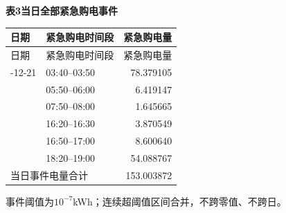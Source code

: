 \begin{center}\textbf{表3\quad 当日全部紧急购电事件}\end{center}
\begin{longtable}{llr}\toprule 日期 & 紧急购电时间段 & 紧急购电量\\\midrule\endfirsthead
\toprule 日期 & 紧急购电时间段 & 紧急购电量\\\midrule\endhead
\bottomrule\endfoot
2025-12-21 & 03:40--03:50 & 78.379105\\
 & 05:50--06:00 & 6.419147\\
 & 07:50--08:00 & 1.645665\\
 & 16:20--16:30 & 3.870549\\
 & 16:50--17:00 & 8.600640\\
 & 18:20--19:00 & 54.088767\\
\midrule\multicolumn{2}{l}{当日事件电量合计} & 153.003872\\
\end{longtable}
\noindent 事件阈值为$10^{-7}$kWh；连续超阈值区间合并，不跨零值、不跨日。
\endgroup
